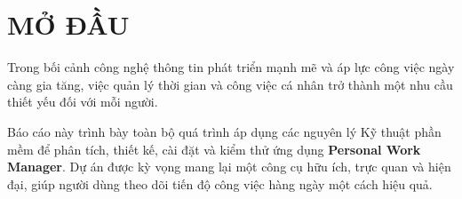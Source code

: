 \section*{MỞ ĐẦU}

Trong bối cảnh công nghệ thông tin phát triển mạnh mẽ và áp lực công việc ngày càng gia tăng, việc quản lý thời gian và công việc cá nhân trở thành một nhu cầu thiết yếu đối với mỗi người. 

Báo cáo này trình bày toàn bộ quá trình áp dụng các nguyên lý Kỹ thuật phần mềm để phân tích, thiết kế, cài đặt và kiểm thử ứng dụng \textbf{Personal Work Manager}. Dự án được kỳ vọng mang lại một công cụ hữu ích, trực quan và hiện đại, giúp người dùng theo dõi tiến độ công việc hàng ngày một cách hiệu quả.
